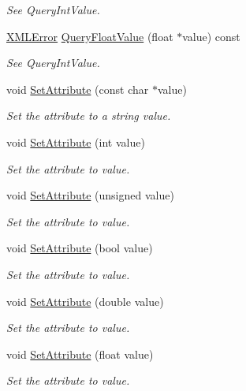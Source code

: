 \begin{DoxyCompactItemize}
\begin{DoxyCompactList}\small\item\em See Query\-Int\-Value. \end{DoxyCompactList}\item 
\hyperlink{namespacetinyxml2_a1fbf88509c3ac88c09117b1947414e08}{X\-M\-L\-Error} \hyperlink{classtinyxml2_1_1_x_m_l_attribute_afb254627c296d1d70b755397d32fece8}{Query\-Float\-Value} (float $\ast$value) const 
\begin{DoxyCompactList}\small\item\em See Query\-Int\-Value. \end{DoxyCompactList}\item 
void \hyperlink{classtinyxml2_1_1_x_m_l_attribute_a406d2c4a13c7af99a65edb59dd9f7581}{Set\-Attribute} (const char $\ast$value)
\begin{DoxyCompactList}\small\item\em Set the attribute to a string value. \end{DoxyCompactList}\item 
void \hyperlink{classtinyxml2_1_1_x_m_l_attribute_ad86d7d7058d76761c3a80662566a57e5}{Set\-Attribute} (int value)
\begin{DoxyCompactList}\small\item\em Set the attribute to value. \end{DoxyCompactList}\item 
void \hyperlink{classtinyxml2_1_1_x_m_l_attribute_ae70468c0f6df2748ba3529c716999fae}{Set\-Attribute} (unsigned value)
\begin{DoxyCompactList}\small\item\em Set the attribute to value. \end{DoxyCompactList}\item 
void \hyperlink{classtinyxml2_1_1_x_m_l_attribute_ab3516def4fe058fe328f2b89fc2d77da}{Set\-Attribute} (bool value)
\begin{DoxyCompactList}\small\item\em Set the attribute to value. \end{DoxyCompactList}\item 
void \hyperlink{classtinyxml2_1_1_x_m_l_attribute_a9a65ab3147abe8ccbbd373ce8791e818}{Set\-Attribute} (double value)
\begin{DoxyCompactList}\small\item\em Set the attribute to value. \end{DoxyCompactList}\item 
void \hyperlink{classtinyxml2_1_1_x_m_l_attribute_ae95e843313aaf5d56c32530b6456df02}{Set\-Attribute} (float value)
\begin{DoxyCompactList}\small\item\em Set the attribute to value. \end{DoxyCompactList}\end{DoxyCompactItemize}
